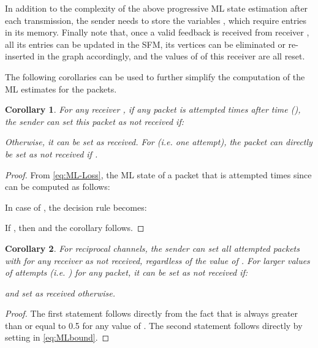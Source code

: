 \documentclass[10pt,jounral]{IEEEtran}
\newtheorem{corollary}{Corollary}
\newcommand{\ignore}[1]{}
\begin{document}
In addition to the complexity of the above progressive ML state estimation after each transmission, the sender needs to store the variables , which require  entries in its memory. Finally note that, once a valid feedback is received from receiver , all its entries   can be updated in the SFM, its vertices can be eliminated or re-inserted in the graph accordingly, and the values of  of this receiver are all reset.


The following corollaries can be used to further simplify the computation of the ML estimates for the packets.

\begin{corollary}\label{th:ML-simple}
For any receiver , if any packet is attempted  times after time  (), the sender can set this packet as not received if:
 
 Otherwise, it can be set as received. For  (i.e. one attempt), the packet can directly be set as not received if \ignore{ } .
\end{corollary}
\begin{proof}
From \eqref{eq:ML-Loss}, the ML state of a packet that is attempted  times since  can be computed as follows:

In case of , the decision rule becomes:

If , then  and the corollary follows.
\end{proof}


\begin{corollary}\label{th:ML-simple-reciprocal}
For reciprocal channels, the sender can set all attempted packets with  for any receiver  as not received, regardless of the value of . For larger values of attempts (i.e. ) for any packet, it can be set as not received if:

and set as received otherwise.
\end{corollary}
\begin{proof}
The first statement follows directly from the fact that  is always greater than or equal to 0.5 for any value of . The second statement follows directly by setting  in \eqref{eq:MLbound}\ignore{ and re-arranging}.
\end{proof}
\end{document}

